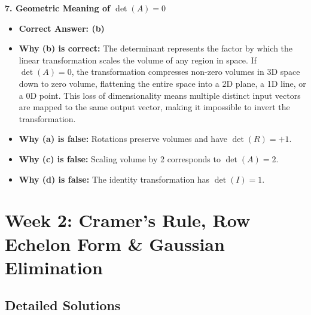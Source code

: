 \textbf{7. Geometric Meaning of $\det(A) = 0$}
\begin{itemize}
    \item \textbf{Correct Answer: (b)}
    \item \textbf{Why (b) is correct:} The determinant represents the factor by which the linear transformation scales the volume of any region in space. If $\det(A) = 0$, the transformation compresses non-zero volumes in 3D space down to zero volume, flattening the entire space into a 2D plane, a 1D line, or a 0D point. This loss of dimensionality means multiple distinct input vectors are mapped to the same output vector, making it impossible to invert the transformation.
    \item \textbf{Why (a) is false:} Rotations preserve volumes and have $\det(R) = +1$.
    \item \textbf{Why (c) is false:} Scaling volume by 2 corresponds to $\det(A) = 2$.
    \item \textbf{Why (d) is false:} The identity transformation has $\det(I) = 1$.
\end{itemize}

\section*{Week 2: Cramer's Rule, Row Echelon Form \& Gaussian Elimination}

\subsection*{Detailed Solutions}

